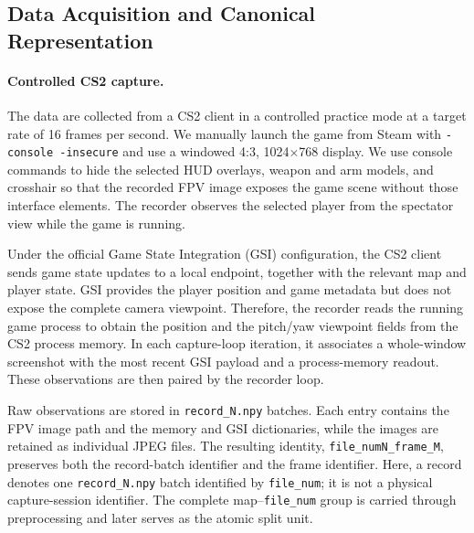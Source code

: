\subsection{Data Acquisition and Canonical Representation}

\paragraph{Controlled CS2 capture.}
The data are collected from a CS2 client in a controlled practice mode at a target rate of 16 frames per second.
We manually launch the game from Steam with \texttt{-console -insecure} and use a windowed 4:3, 1024$\times$768 display.
We use console commands to hide the selected HUD overlays, weapon and arm models, and crosshair so that the recorded FPV image exposes the game scene without those interface elements.
The recorder observes the selected player from the spectator view while the game is running.

Under the official Game State Integration (GSI) configuration, the CS2 client sends game state updates to a local endpoint, together with the relevant map and player state.
GSI provides the player position and game metadata but does not expose the complete camera viewpoint.
Therefore, the recorder reads the running game process to obtain the position and the pitch/yaw viewpoint fields from the CS2 process memory.
In each capture-loop iteration, it associates a whole-window screenshot with the most recent GSI payload and a process-memory readout. These observations are then paired by the recorder loop.

Raw observations are stored in \texttt{record\_N.npy} batches.
Each entry contains the FPV image path and the memory and GSI dictionaries, while the images are retained as individual JPEG files.
The resulting identity, \texttt{file\_numN\_frame\_M}, preserves both the record-batch identifier and the frame identifier.
Here, a record denotes one \texttt{record\_N.npy} batch identified by \texttt{file\_num}; it is not a physical capture-session identifier.
The complete map--\texttt{file\_num} group is carried through preprocessing and later serves as the atomic split unit.

